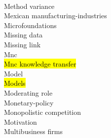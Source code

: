 \documentclass[a4paper]{article}
\begin{document}
\begin{multicols*}{2}
\begin{footnotesize}
 \\ Method variance \\ Mexican manufacturing-industries \\ Microfoundations \\ Missing data \\ Missing link \\ Mnc \\ \hl{Mnc knowledge transfer} \\ Model \\ \hl{Models} \\ Moderating role \\ Monetary-policy \\ Monopolistic competition \\ Motivation \\ Multibusiness firms 
\end{footnotesize}
\end{multicols*}
\end{document}
